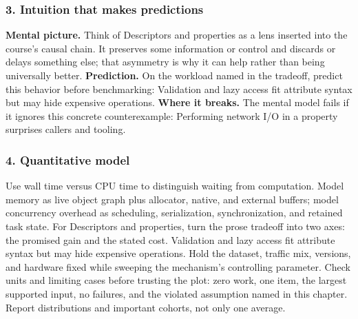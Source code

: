 \subsubsection*{3. Intuition that makes predictions}
\textbf{Mental picture.} Think of Descriptors and properties as a lens inserted into the course's causal chain. It preserves some information or control and discards or delays something else; that asymmetry is why it can help rather than being universally better.
\textbf{Prediction.} On the workload named in the tradeoff, predict this behavior before benchmarking: Validation and lazy access fit attribute syntax but may hide expensive operations.
\textbf{Where it breaks.} The mental model fails if it ignores this concrete counterexample: Performing network I/O in a property surprises callers and tooling.
\subsubsection*{4. Quantitative model}
Use wall time versus CPU time to distinguish waiting from computation. Model memory as live object graph plus allocator, native, and external buffers; model concurrency overhead as scheduling, serialization, synchronization, and retained task state.
For Descriptors and properties, turn the prose tradeoff into two axes: the promised gain and the stated cost. Validation and lazy access fit attribute syntax but may hide expensive operations. Hold the dataset, traffic mix, versions, and hardware fixed while sweeping the mechanism's controlling parameter.
Check units and limiting cases before trusting the plot: zero work, one item, the largest supported input, no failures, and the violated assumption named in this chapter. Report distributions and important cohorts, not only one average.
